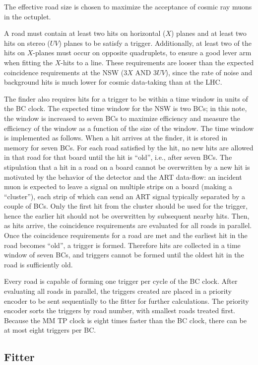 The effective road size is chosen to maximize the acceptance of cosmic ray muons in the octuplet. 

A road must contain at least two hits on horizontal ($X$) planes and at least two hits on stereo ($UV$) planes to be satisfy a trigger. Additionally, at least two of the hits on $X$-planes must occur on opposite quadruplets, to ensure a good lever arm when fitting the $X$-hits to a line. These requirements are looser than the expected coincidence requirements at the NSW ($3X$ AND $3UV$), since the rate of noise and background hits is much lower for cosmic data-taking than at the LHC.

The finder also requires hits for a trigger to be within a time window in units of the BC clock. The expected time window for the NSW is two BCs; in this note, the window is increased to seven BCs to maximize efficiency and measure the efficiency of the window as a function of the size of the window. The time window is implemented as follows. When a hit arrives at the finder, it is stored in memory for seven BCs. For each road satisfied by the hit, no new hits are allowed in that road for that board until the hit is ``old'', i.e., after seven BCs. The stipulation that a hit in a road on a board cannot be overwritten by a new hit is motivated by the behavior of the detector and the ART data-flow: an incident muon is expected to leave a signal on multiple strips on a board (making a ``cluster''), each strip of which can send an ART signal typically separated by a couple of BCs. Only the first hit from the cluster should be used for the trigger, hence the earlier hit should not be overwritten by subsequent nearby hits. Then, as hits arrive, the coincidence requirements are evaluated for all roads in parallel. Once the coincidence requirements for a road are met and the earliest hit in the road becomes ``old'', a trigger is formed. Therefore hits are collected in a time window of seven BCs, and triggers cannot be formed until the oldest hit in the road is sufficiently old.

Every road is capable of forming one trigger per cycle of the BC clock. After evaluating all roads in parallel, the triggers created are placed in a priority encoder to be sent sequentially to the fitter for further calculations. The priority encoder sorts the triggers by road number, with smallest roads treated first. Because the MM TP clock is eight times faster than the BC clock, there can be at most eight triggers per BC.

\subsection{Fitter}
\label{sec:alg-fitter}

